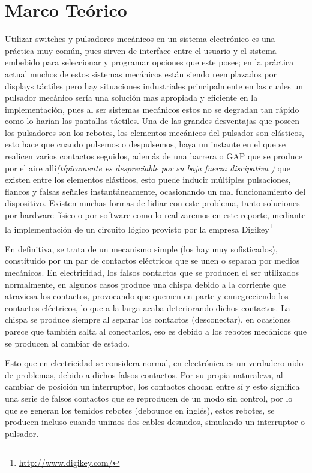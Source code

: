 \documentclass[paper=a4, fontsize=12pt]{article} 		%
\newcommand\fnurl[2]{%
\href{#2}{#1}\footnote{\url{#2}}%
}
\numberwithin{equation}{section}						%
\numberwithin{figure}{section} 							%
\numberwithin{table}{section} 							%
\begin{document}
\section{Marco Teórico}
\label{sec:problemamecanico}
Utilizar switches y pulsadores mecánicos en un sistema electrónico es una práctica muy común, pues sirven de interface entre el usuario y el sistema embebido para seleccionar y programar opciones que este posee; en la práctica actual muchos de estos sistemas mecánicos están siendo reemplazados por displays táctiles pero hay situaciones industriales principalmente en las cuales un pulsador mecánico sería una solución mas apropiada y eficiente en la implementación, pues al ser sistemas mecánicos estos no se degradan tan rápido como lo harían las pantallas táctiles. Una de las grandes desventajas que poseen los pulsadores son los rebotes, los elementos mecánicos del pulsador son elásticos, esto hace que cuando pulsemos o despulsemos, haya un instante en el que se realicen varios contactos seguidos, además de una barrera o GAP que se produce por el aire allí\textit{(típicamente es despreciable por su baja fuerza discipativa )} que existen entre los elementos elásticos, esto puede inducir múltiples pulsaciones, flancos y falsas señales instantáneamente, ocasionando un mal funcionamiento del dispositivo.
Existen muchas formas de lidiar con este problema, tanto soluciones por hardware físico o por software como lo realizaremos en este reporte, mediante la implementación de un circuito lógico provisto por la empresa \fnurl{Digikey}{http://www.digikey.com/}

En definitiva, se trata de un mecanismo simple (los hay muy sofisticados), constituido por un par de contactos eléctricos que se unen o separan por medios mecánicos. En electricidad, los falsos contactos que se producen el ser utilizados normalmente, en algunos casos produce una chispa debido a la corriente que atraviesa los contactos, provocando que quemen en parte y ennegreciendo los contactos eléctricos, lo que a la larga acaba deteriorando dichos contactos. La chispa se produce siempre al separar los contactos (desconectar), en ocasiones parece que también salta al conectarlos, eso es debido a los rebotes mecánicos que se producen al cambiar de estado.

Esto que en electricidad se considera normal, en electrónica es un verdadero nido de problemas, debido a dichos falsos contactos. Por su propia naturaleza, al cambiar de posición un interruptor, los contactos chocan entre sí y esto significa una serie de falsos contactos que se reproducen de un modo sin control, por lo que se generan los temidos rebotes (debounce en inglés), estos rebotes, se producen incluso cuando unimos dos cables desnudos, simulando un interruptor o pulsador.
\end{document}
